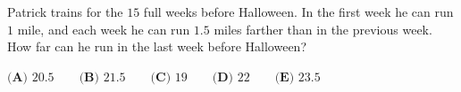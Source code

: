Patrick trains for the $15$ full weeks before Halloween. In the first week he can run $1$ mile, and each week he can run $1.5$ miles farther than in the previous week. How far can he run in the last week before Halloween?

$\textbf{(A) }20.5\qquad\textbf{(B) }21.5\qquad\textbf{(C) }19\qquad\textbf{(D) }22\qquad\textbf{(E) }23.5$
